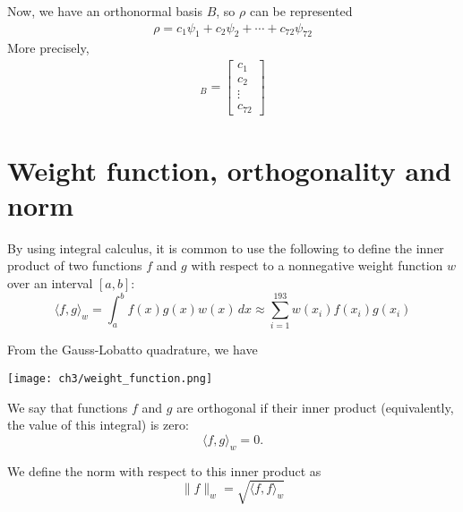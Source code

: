 \begin{definition}
Now, we have an orthonormal basis $B$, so $\rho$ can be represented
\begin{align*}
        \rho = c_1 \psi_1 + c_2 \psi_2 + \cdots + c_{72} \psi_{72}        
\end{align*}
More precisely,
\begin{align*}
        [\rho]_{B} =  \begin{bmatrix} c_1 \\ c_2 \\ \vdots \\ c_{72} \end{bmatrix}
\end{align*}      
\end{definition}

\section{Weight function, orthogonality and norm}
\begin{definition}
By using integral calculus, it is common to use the following to define the inner product of two functions $f$ and $g$ with respect to a nonnegative weight function $w$ over an interval $[a, b]$:
\begin{equation}
        \langle f, g\rangle_w = \int_a^b f(x)g(x)w(x)\,dx \approx \sum_{i=1}^{193}w(x_i)f(x_i)g(x_i) 
\end{equation}
\end{definition}

\begin{definition}
From the  Gauss-Lobatto quadrature, we have
\begin{center}
        \texttt{[image: ch3/weight\_function.png]}   
\end{center}
\end{definition}

\begin{definition}[Orthogonal]
We say that functions $f$ and $g$ are orthogonal if their inner product (equivalently, the value of this integral) is zero:
\begin{equation}
        \langle f,g\rangle _{w}=0.
\end{equation}
\end{definition}

\begin{definition}[Norm]
We define the norm with respect to this inner product as
\begin{equation}
        \|f\|_w = \sqrt{\langle f, f\rangle_w}
\end{equation}
\end{definition}

